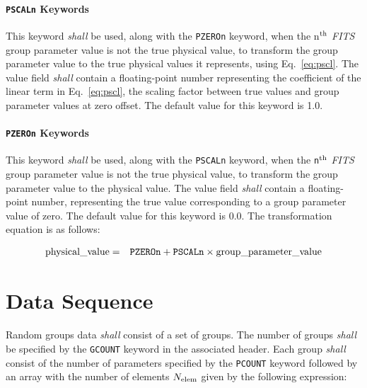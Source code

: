 \documentclass[11pt,makeidx]{book}     %
\begin{document}
   \paragraph{{\tt PSCALn} Keywords}
    \label{s:pscl}
   This keyword {\em shall} be used, along
   with the {\tt PZEROn}
   keyword, when the n$^{\rm th}$ {\em FITS\/} group parameter 
   value is not the true
   physical value, to transform the 
   group parameter value to the true physical values it represents, 
   using Eq.\ \ref{eq:pscl}. 
   The value field {\em shall} contain a floating-point number representing 
   the coefficient of the linear term in Eq.\ \ref{eq:pscl}, the scaling 
   factor between true values and group parameter values 
   at zero offset.  The default value for this keyword is 1.0. 
  
   \paragraph{{\tt PZEROn} Keywords}
   \label{s:pzer}
   This keyword {\em shall} be used, along
   with the {\tt PSCALn} keyword, when 
   the {\tt n}$^{\rm th}$ {\em FITS\/} group parameter 
   value is not the true physical
   value, to transform the group parameter value to the physical value.  
   The value field {\em shall} contain a floating-point number,
   representing the true value corresponding to a group
   parameter value of zero.  The default value for this keyword is 0.0.  
   The transformation equation is as follows: 

\begin{eqnarray}  
    \mbox{physical\_value} & = & \mbox{{\tt PZEROn}} + \mbox{{\tt PSCALn}} 
                        \times \mbox{group\_parameter\_value} \label{eq:pscl}
\end{eqnarray}  
  
\section{Data Sequence}
 \label{s:grdata}
  Random groups data {\em shall} consist of a set of groups.  The number of
  groups {\em shall} be specified by the {\tt GCOUNT} keyword in the associated
  header.  Each group {\em shall} consist of the number
  of
  parameters specified by the {\tt PCOUNT} 
  keyword followed by an array with the number of 
  elements $N_{\rm elem}$  given 
  by the following
  expression:
\end{document}
